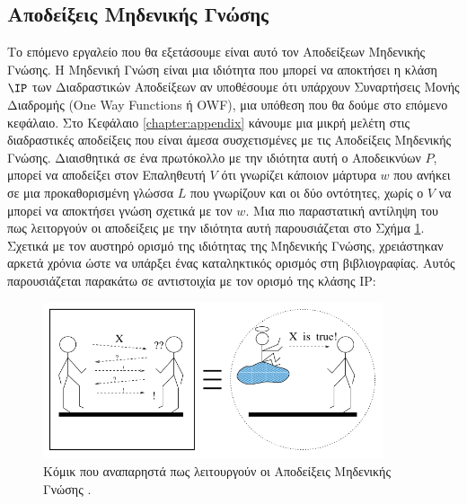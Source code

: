 \subsection{Αποδείξεις Μηδενικής Γνώσης}

Το επόμενο εργαλείο που θα εξετάσουμε είναι αυτό τον Αποδείξεων Μηδενικής Γνώσης. Η Μηδενική Γνώση είναι μια ιδιότητα που μπορεί να αποκτήσει η κλάση $\IP$ των Διαδραστικών Αποδείξεων αν υποθέσουμε ότι υπάρχουν Συναρτήσεις Μονής Διαδρομής (One Way Functions ή OWF), μια υπόθεση που θα δούμε στο επόμενο κεφάλαιο. Στο Κεφάλαιο \ref{chapter:appendix} κάνουμε μια μικρή μελέτη στις διαδραστικές αποδείξεις που είναι άμεσα συσχετισμένες με τις Αποδείξεις Μηδενικής Γνώσης. Διαισθητικά σε ένα πρωτόκολλο με την ιδιότητα αυτή ο Αποδεικνύων $P$, μπορεί να αποδείξει στον Επαληθευτή $V$ ότι γνωρίζει κάποιον μάρτυρα $w$ που ανήκει σε μια προκαθορισμένη γλώσσα $L$ που γνωρίζουν και οι δύο οντότητες, χωρίς ο $V$ να μπορεί να αποκτήσει γνώση σχετικά με τον $w$. Μια πιο παραστατική αντίληψη του πως λειτοργούν οι αποδείξεις με την ιδιότητα αυτή παρουσιάζεται στο Σχήμα \ref{fig:zero_knowledge_comic}. Σχετικά με τον αυστηρό ορισμό της ιδιότητας της Μηδενικής Γνώσης, χρειάστηκαν αρκετά χρόνια ώστε να υπάρξει ένας καταληκτικός ορισμός στη βιβλιογραφίας. Αυτός παρουσιάζεται παρακάτω σε αντιστοιχία με τον ορισμό της κλάσης IP:

\begin{figure}[ht]
    \centering
    \includegraphics[width=10cm]{./01_body/images/zero_knowledge_comic.png}
    \caption{Κόμικ που αναπαρηστά πως λειτουργούν οι Αποδείξεις Μηδενικής Γνώσης \cite{goldreich2013short}.}
    \label{fig:zero_knowledge_comic}
\end{figure}

